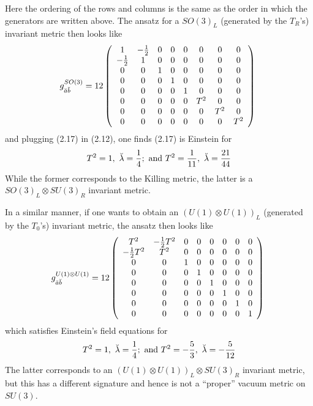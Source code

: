 \documentclass[a4paper,12pt]{article}
\begin{document}
Here the ordering of the rows and columns is the same as the order in which the generators are written above. The ansatz for a $SO(3)_L$ (generated by the $T_R$'s) invariant metric then looks like
\begin{equation}
g^{SO(3)}_{\breve{a}\breve{b}}=12\left( \begin{array}{cccccccc}
1& -\textstyle{1\over 2}&0&0&0&0&0&0\\
-\textstyle{1\over 2}& 1&0&0&0&0&0&0\\
0& 0  &1&0&0&0&0&0\\
0& 0  &0&1&0&0&0&0\\
0& 0  &0&0&1&0&0&0\\
0& 0  &0&0&0&T^2&0&0\\
0& 0  &0&0&0&0&T^2&0\\
0& 0  &0&0&0&0&0&T^2
\end{array} \right)\ 
\end{equation}
and plugging (2.17) in (2.12), one finds (2.17) is Einstein for 
\begin{equation}
T^2=1,\ \breve{\la}=\4;\mbox{ and } T^2=\frac{1}{11},\ \breve{\la}=\frac{21}{44}
\end{equation}
While the former corresponds to the Killing metric, the latter is a $SO(3)_L\otimes SU(3)_R$ invariant metric.

In a similar manner, if one wants to obtain an $(U(1)\otimes U(1))_L$ (generated by the $T_0$'s) invariant metric, the ansatz then looks like
\begin{equation}
g^{U(1)\otimes U(1)}_{\breve{a}\breve{b}}=12\left( \begin{array}{cccccccc}
T^2& -\textstyle{1\over 2} T^2&0&0&0&0&0&0\\
-\textstyle{1\over 2} T^2& T^2&0&0&0&0&0&0\\
0& 0  &1&0&0&0&0&0\\
0& 0  &0&1&0&0&0&0\\
0& 0  &0&0&1&0&0&0\\
0& 0  &0&0&0&1&0&0\\
0& 0  &0&0&0&0&1&0\\
0& 0  &0&0&0&0&0&1
\end{array} \right)\ 
\end{equation}
which  satisfies Einstein's field equations for
\begin{equation}
T^2=1,\ \breve{\lambda}=\frac{1}{4};\mbox{ and } T^2=-\frac{5}{3},\ \breve{\lambda}=-\frac{5}{12}
\end{equation}
The latter corresponds to an $(U(1)\otimes U(1))_L\otimes SU(3)_R$ invariant metric, but this has a different signature and hence is not a ``proper'' vacuum metric on $SU(3)$. 
\end{document}
